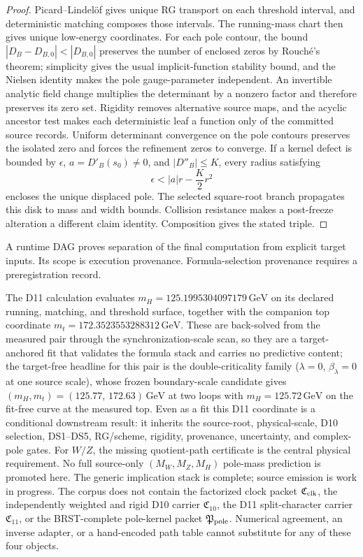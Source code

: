 \documentclass[11pt]{article}
\begin{document}
\begin{proof}
Picard--Lindel\"of gives unique RG transport on each threshold interval, and
deterministic matching composes those intervals.  The running-mass chart then
gives unique low-energy coordinates.  For each pole contour, the bound
\(|D_B-D_{B,0}|<|D_{B,0}|\) preserves the number of enclosed zeros by
Rouch\'e's theorem; simplicity gives the usual implicit-function stability
bound, and the Nielsen identity makes the pole gauge-parameter independent.
An invertible analytic field change multiplies the determinant by a nonzero
factor and therefore preserves its zero set.  Rigidity removes alternative source maps, and the acyclic
ancestor test makes each deterministic leaf a function only of the committed
source records. Uniform determinant convergence on the pole contours preserves
the isolated zero and forces the refinement zeros to converge. If a kernel
defect is bounded by \(\epsilon\), \(a=D'_B(s_0)\ne0\), and
\(|D''_B|\le K\), every radius satisfying
\[
 \epsilon<|a|r-\frac K2r^2
\]
encloses the unique displaced pole. The selected square-root branch propagates
this disk to mass and width bounds. Collision resistance makes a post-freeze
alteration a different claim identity. Composition gives the stated triple.
\end{proof}

A runtime DAG proves separation of the final computation from explicit target
inputs. Its scope is execution provenance. Formula-selection provenance
requires a preregistration record.

The D11 calculation evaluates
\(m_H=125.1995304097179\,\mathrm{GeV}\) on its declared running, matching, and
threshold surface, together with the companion top coordinate
\(m_t=172.3523553288312\,\mathrm{GeV}\).  These are back-solved from the
measured pair through the synchronization-scale scan, so they are a
target-anchored fit that validates the formula stack and carries no predictive
content; the target-free headline for this pair is the double-criticality
family (\(\lambda=0\), \(\beta_\lambda=0\) at one source scale), whose frozen
boundary-scale candidate gives \((m_H,m_t)=(125.77,\,172.63)\,\mathrm{GeV}\) at
two loops with \(m_H=125.72\,\mathrm{GeV}\) on the fit-free curve at the
measured top.  Even as a fit this D11 coordinate is a conditional downstream
result: it inherits the source-root, physical-scale, D10 selection, DS1--DS5,
RG/scheme, rigidity, provenance, uncertainty, and complex-pole gates.  For \(W/Z\), the
missing quotient-path certificate is the central physical requirement. No
full source-only \((M_W,M_Z,M_H)\) pole-mass prediction is promoted here.
The generic implication stack is complete; source emission is work in progress.
The corpus does
not contain the factorized clock packet \(\mathfrak C_{\rm clk}\), the
independently weighted and rigid D10 carrier \(\mathfrak C_{10}\), the D11
split-character carrier \(\mathfrak C_{11}\), or the BRST-complete pole-kernel
packet \(\mathfrak P_{\rm pole}\). Numerical agreement, an inverse adapter, or
a hand-encoded path table cannot substitute for any of these four objects.
\end{document}
